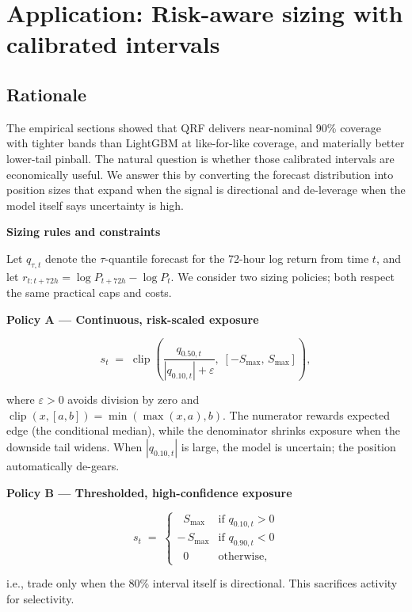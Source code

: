 \documentclass[
  a4paper,
  DIV=11,
  numbers=noendperiod]{scrreprt}
\begin{document}

\chapter{Application: Risk-aware sizing with calibrated
intervals}\label{application-risk-aware-sizing-with-calibrated-intervals}

\section{Rationale}\label{rationale}

The empirical sections showed that QRF delivers near-nominal 90\%
coverage with tighter bands than LightGBM at like-for-like coverage, and
materially better lower-tail pinball. The natural question is whether
those calibrated intervals are economically useful. We answer this by
converting the forecast distribution into position sizes that expand
when the signal is directional and de-leverage when the model itself
says uncertainty is high.

\textbf{Sizing rules and constraints}

Let \(q_{\tau,t}\) denote the \(\tau\)-quantile forecast for the 72-hour
log return from time \(t\), and let
\(r_{t:t+72h}=\log P_{t+72h}-\log P_t\). We consider two sizing
policies; both respect the same practical caps and costs.

\textbf{Policy A --- Continuous, risk-scaled exposure}

\[
s_t \;=\; \operatorname{clip}\!\left(\frac{q_{0.50,t}}{|q_{0.10,t}|+\varepsilon},\;\left[-S_{\max},\,S_{\max}\right]\right),
\]

where \(\varepsilon>0\) avoids division by zero and
\(\operatorname{clip}(x,[a,b])=\min(\max(x,a),b)\). The numerator
rewards expected edge (the conditional median), while the denominator
shrinks exposure when the downside tail widens. When \(|q_{0.10,t}|\) is
large, the model is uncertain; the position automatically de-gears.

\textbf{Policy B --- Thresholded, high-confidence exposure}

\[
s_t \;=\;
\begin{cases}
\;\;S_{\max} & \text{if } q_{0.10,t}>0 \\
-\,S_{\max}  & \text{if } q_{0.90,t}<0 \\
\;\;0        & \text{otherwise,}
\end{cases}
\]

i.e., trade only when the 80\% interval itself is directional. This
sacrifices activity for selectivity.
\end{document}
